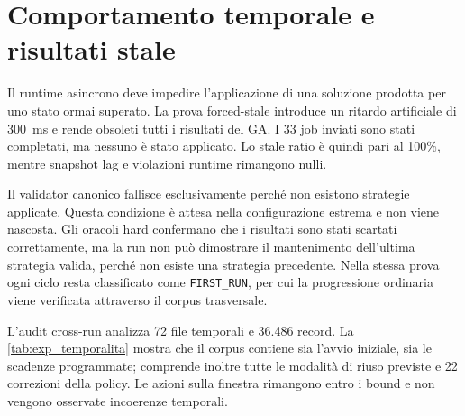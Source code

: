 \section{Comportamento temporale e risultati stale}
\label{sec:exp_temporalita}

Il runtime asincrono deve impedire l'applicazione di una soluzione prodotta per uno stato ormai superato. La prova forced-stale introduce un ritardo artificiale di 300~ms e rende obsoleti tutti i risultati del GA. I 33 job inviati sono stati completati, ma nessuno è stato applicato. Lo stale ratio è quindi pari al 100\%, mentre snapshot lag e violazioni runtime rimangono nulli.

Il validator canonico fallisce esclusivamente perché non esistono strategie applicate. Questa condizione è attesa nella configurazione estrema e non viene nascosta. Gli oracoli hard confermano che i risultati sono stati scartati correttamente, ma la run non può dimostrare il mantenimento dell'ultima strategia valida, perché non esiste una strategia precedente. Nella stessa prova ogni ciclo resta classificato come \texttt{FIRST\_RUN}, per cui la progressione ordinaria viene verificata attraverso il corpus trasversale.

L'audit cross-run analizza 72 file temporali e 36.486 record. La \cref{tab:exp_temporalita} mostra che il corpus contiene sia l'avvio iniziale, sia le scadenze programmate; comprende inoltre tutte le modalità di riuso previste e 22 correzioni della policy. Le azioni sulla finestra rimangono entro i bound e non vengono osservate incoerenze temporali.

